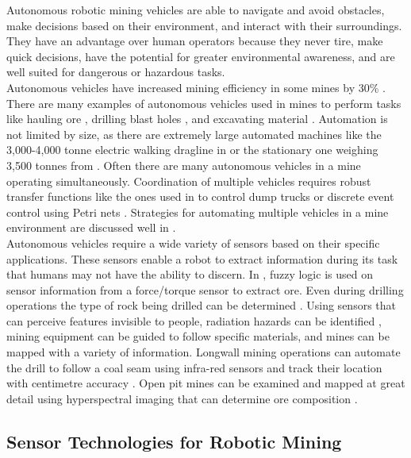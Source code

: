 Autonomous robotic mining vehicles are able to navigate and avoid obstacles, make decisions based on their environment, and interact with their surroundings. They have an advantage over human operators because they never tire, make quick decisions, have the potential for greater environmental awareness, and are well suited for dangerous or hazardous tasks.\\

Autonomous vehicles have increased mining efficiency in some mines by 30\% \cite{30p}. There are many examples of autonomous vehicles used in mines to perform tasks like hauling ore \cite{haul}, drilling blast holes \cite{blast}, and excavating material \cite{excavate}. Automation is not limited by size, as there are extremely large automated machines like the 3,000-4,000 tonne electric walking dragline in \cite{large} or the stationary one weighing 3,500 tonnes from \cite{3500}. Often there are many autonomous vehicles in a mine operating simultaneously. Coordination of multiple vehicles requires robust transfer functions like the ones used in \cite{dump} to control dump trucks or discrete event control using Petri nets \cite{petri}. Strategies for automating multiple vehicles in a mine environment are discussed well in \cite{multi}.\\

Autonomous vehicles require a wide variety of sensors based on their specific applications. These sensors enable a robot to extract information during its task that humans may not have the ability to discern. In \cite{fuzzy}, fuzzy logic is used on sensor information from a force/torque sensor to extract ore. Even during drilling operations the type of rock being drilled can be determined \cite{drill}. Using sensors that can perceive features invisible to people, radiation hazards can be identified \cite{radio}, mining equipment can be guided to follow specific materials, and mines can be mapped with a variety of information. Longwall mining operations can automate the drill to follow a coal seam using infra-red sensors \cite{seam} and track their location with centimetre accuracy \cite{real}. Open pit mines can be examined and mapped at great detail using hyperspectral imaging that can determine ore composition \cite{spectral}.\\

\subsection{Sensor Technologies for Robotic Mining}

